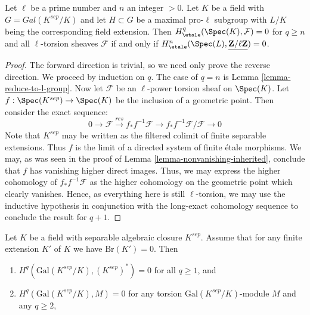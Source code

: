 \begin{lemma}
\label{lemma-reduce-to-l-group-higher}
Let $\ell$ be a prime number and $n$ an integer $> 0$.
Let $K$ be a field with $G = Gal(K^{sep}/K)$ and let
$H \subset G$ be a maximal pro-$\ell$ subgroup 
with $L/K$ being the corresponding field extension.
Then $H^q_\etale(\Spec(K),\mathcal{F}) = 0$ for $q \geq n$ and all
$\ell$-torsion sheaves $\mathcal{F}$ if  and only if
$H^n_\etale(\Spec(L), \underline{\mathbf{Z}/\ell\mathbf{Z}}) = 0$.
\end{lemma}

\begin{proof}
The forward direction is trivial, so we need only prove the reverse direction. 
We proceed by induction on $q$. The case of $q = n$ is
Lemma \ref{lemma-reduce-to-l-group}. Now let 
$\mathcal{F}$ be an $\ell$-power torsion sheaf on $\Spec(K)$.
Let $f : \Spec(K^{sep}) \rightarrow \Spec(K)$
be the inclusion of a geometric point.
Then consider the exact sequence:
$$
0 \rightarrow \mathcal{F} \xrightarrow{res}
f_* f^{-1} \mathcal{F} \rightarrow f_* f^{-1} \mathcal{F}/\mathcal{F} 
\rightarrow 0
$$
Note that $K^{sep}$ may be written as the filtered colimit of finite 
separable extensions. Thus $f$
is the limit of a directed system of finite \'etale  morphisms.
We may, as was seen in the proof of
Lemma \ref{lemma-nonvanishing-inherited}, conclude that $f$ has 
vanishing higher direct images. Thus, we may express the higher cohomology of 
$f_* f^{-1} \mathcal{F}$ as the higher cohomology on the geometric point which 
clearly vanishes. Hence, as everything here is still $\ell$-torsion, we may use 
the inductive hypothesis in conjunction with the long-exact cohomology sequence 
to conclude the result for $q + 1$.
\end{proof}

\begin{proposition}
\label{proposition-serre-galois}
\begin{reference}
\cite[Chapter II, Section 3, Proposition 5]{SerreGaloisCohomology}
\end{reference}
Let $K$ be a field with separable algebraic closure $K^{sep}$.
Assume that for any finite extension $K'$ of $K$ we have
$\text{Br}(K') = 0$. Then
\begin{enumerate}
\item $H^q(\text{Gal}(K^{sep}/K), (K^{sep})^*) = 0$
for all $q \geq 1$, and
\item $H^q(\text{Gal}(K^{sep}/K), M) = 0$
for any torsion $\text{Gal}(K^{sep}/K)$-module $M$ and any $q \geq 2$,
\end{enumerate}
\end{proposition}

